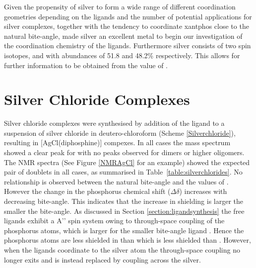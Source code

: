 
Given the propensity of silver to form a wide range of different coordination geometries depending on the ligands and the number of potential applications for silver complexes, together with the tendency to coordinate xantphos close to the natural bite-angle, made silver an excellent metal to begin our investigation of the coordination chemistry of the \tBuxantphos{} ligands.  Furthermore silver consists of two spin  isotopes, \Agseven{} and \Agnine{} with abundances of 51.8 and 48.2\% respectively.  This allows for further information to be obtained from the value of \JAgP{}.

\section{Silver Chloride Complexes}

Silver chloride complexes were synthesised by addition of the \tBuxantphos{} ligand to a suspension of silver chloride in deutero-chloroform (Scheme \ref{Silverchloride}), resulting in [AgCl(diphosphine)] compexes.  In all cases the mass spectrum showed a clear peak for \ce{[M-Cl]+} with no peaks observed for dimers or higher oligomers.  The \phosphorus{} NMR spectra (See Figure \ref{NMRAgCl} for an example) showed the expected pair of doublets in all cases, as summarised in Table~\ref{table:silverchlorides}.  No relationship is observed between the natural bite-angle and the values of \JAgP.  However the change in the phosphorus chemical shift ($\Delta\delta$) increases with decreasing bite-angle.  This indicates that the increase in shielding is larger the smaller the bite-angle.  As discussed in Section \ref{section:ligandsynthesis} the free \tBuxantphos{} ligands exhibit a  A'' spin system owing to through-space coupling of the phosphorus atoms, which is larger for the smaller bite-angle ligand \tBusixantphos{}.  Hence the phosphorus atoms are less shielded in \tBusixantphos{} than \tButhixantphos{} which is less shielded than \tBuxantphos.  However, when the ligands coordinate to the silver atom the through-space coupling no longer exits and is instead replaced by coupling across the silver.  

